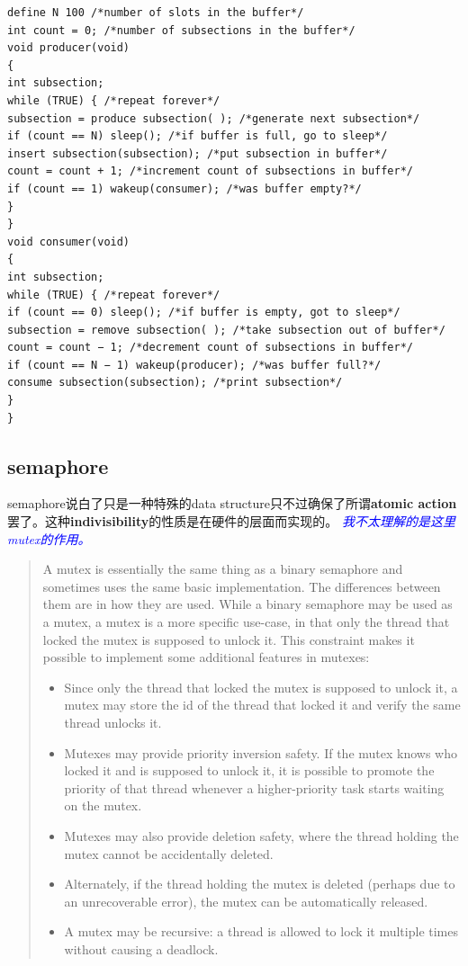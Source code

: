 \documentclass[a4paper]{article}
\newcommand{\problem}[1]{\textcolor{blue}{\textit{#1}}}
\begin{document}
\begin{centering}
\begin{verbatim}
define N 100 /*number of slots in the buffer*/
int count = 0; /*number of subsections in the buffer*/
void producer(void)
{
int subsection;
while (TRUE) { /*repeat forever*/
subsection = produce subsection( ); /*generate next subsection*/
if (count == N) sleep(); /*if buffer is full, go to sleep*/
insert subsection(subsection); /*put subsection in buffer*/
count = count + 1; /*increment count of subsections in buffer*/
if (count == 1) wakeup(consumer); /*was buffer empty?*/
}
}
void consumer(void)
{
int subsection;
while (TRUE) { /*repeat forever*/
if (count == 0) sleep(); /*if buffer is empty, got to sleep*/
subsection = remove subsection( ); /*take subsection out of buffer*/
count = count − 1; /*decrement count of subsections in buffer*/
if (count == N − 1) wakeup(producer); /*was buffer full?*/
consume subsection(subsection); /*print subsection*/
}
}
\end{verbatim}
\end{centering}

\subsection{semaphore}
semaphore说白了只是一种特殊的data structure只不过确保了所谓\textbf{atomic
  action}罢了。这种\textbf{indivisibility}的性质是在硬件的层面而实现的。
\problem{我不太理解的是这里mutex的作用。}

\begin{centering}
\begin{quote}
A mutex is essentially the same thing as a binary semaphore and sometimes uses the same basic implementation. The differences between them are in how they are used. While a binary semaphore may be used as a mutex, a mutex is a more specific use-case, in that only the thread that locked the mutex is supposed to unlock it. This constraint makes it possible to implement some additional features in mutexes:
\begin{itemize}
  \item{Since only the thread that locked the mutex is supposed to unlock it, a mutex may store the id of the thread that locked it and verify the same thread unlocks it.}
  \item{Mutexes may provide priority inversion safety. If the mutex knows who locked it and is supposed to unlock it, it is possible to promote the priority of that thread whenever a higher-priority task starts waiting on the mutex.}
  \item{Mutexes may also provide deletion safety, where the thread holding the mutex cannot be accidentally deleted.}
  \item{Alternately, if the thread holding the mutex is deleted (perhaps due to an unrecoverable error), the mutex can be automatically released.}
  \item{A mutex may be recursive: a thread is allowed to lock it multiple times without causing a deadlock.}
\end{itemize}
\end{quote}
\end{centering}
\end{document}
